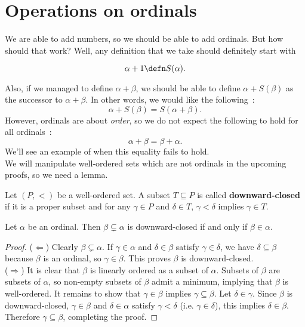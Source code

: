 \section{Operations on ordinals}

We are able to add numbers, so we should be able to add ordinals. But how should that work? Well, any definition that we take should definitely start with

\[
    \alpha + 1 \defn S(\alpha).     
\]

Also, if we managed to define $\alpha + \beta$, we should be able to define $\alpha + S(\beta)$ as the successor to $\alpha + \beta$. In other words, we would like the following~:
\[
    \alpha + S(\beta) = S(\alpha + \beta).
\]
However, ordinals are about \textit{order}, so we do not expect the following to hold for all ordinals~:
\[
    \alpha + \beta = \beta + \alpha.    
\]
We'll see an example of when this equality fails to hold.
\\

We will manipulate well-ordered sets which are not ordinals in the upcoming proofs, so we need a lemma.

\begin{definition} \label{downward-closed-subsets}
    Let $(P, <)$ be a well-ordered set. A subset $T \subseteq P$ is called \textbf{downward-closed} if it is a proper subset and for any $\gamma \in P$ and $\delta \in T$, $\gamma < \delta$ implies $\gamma \in T$. 
\end{definition}

\begin{lemma} \label{downward-closed-subsets-of-ordinals-are-ordinals}
    Let $\alpha$ be an ordinal. Then $\beta \subsetneq \alpha$ is downward-closed if and only if $\beta \in \alpha$. 
\end{lemma}

\begin{proof}
    ($\Leftarrow$) Clearly $\beta \subsetneq \alpha$. If $\gamma \in \alpha$ and $\delta \in \beta$ satisfy $\gamma \in \delta$, we have $\delta \subseteq \beta$ because $\beta$ is an ordinal, so $\gamma \in \beta$. This proves $\beta$ is downward-closed.
    \\

    ($\Rightarrow$) It is clear that $\beta$ is linearly ordered as a subset of $\alpha$. Subsets of $\beta$ are subsets of $\alpha$, so non-empty subsets of $\beta$ admit a minimum, implying that $\beta$ is well-ordered. It remains to show that $\gamma \in \beta$ implies $\gamma \subseteq \beta$. Let $\delta \in \gamma$. Since $\beta$ is downward-closed, $\gamma \in \beta$ and $\delta \in \alpha$ satisfy $\gamma < \delta$ (i.e. $\gamma \in \delta$), this implies $\delta \in \beta$. Therefore $\gamma \subseteq \beta$, completing the proof.
\end{proof}

